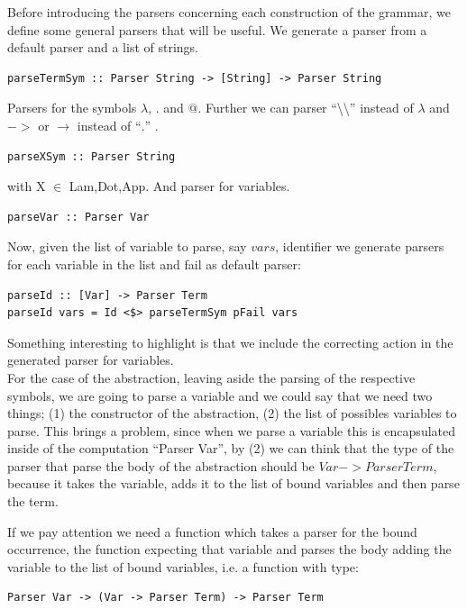 \documentclass[a4paper,10pt]{article}
\begin{document}
Before introducing the parsers concerning each construction of the grammar, 
we define some general parsers that will be useful.
We generate a parser from a default parser and a list of strings.

\begin{lstlisting}
parseTermSym :: Parser String -> [String] -> Parser String
\end{lstlisting}

Parsers for the symbols $\lambda$, $.$ and $@$. Further we can
parser ``\textbackslash \textbackslash'' instead of $\lambda$ and $->$ or $\rightarrow$
instead of ``$.$'' .

\begin{lstlisting}
parseXSym :: Parser String
\end{lstlisting} with X $\in$ {Lam,Dot,App}. And parser for variables.

\begin{lstlisting}
parseVar :: Parser Var
\end{lstlisting}

Now, given the list of variable to parse, say $vars$, identifier
we generate parsers for each variable in the list and fail as default parser:

\begin{lstlisting}
parseId :: [Var] -> Parser Term
parseId vars = Id <$> parseTermSym pFail vars
\end{lstlisting}

Something interesting to highlight is that we include the correcting action in
the generated parser for variables.\\

For the case of the abstraction, leaving aside the parsing of the respective symbols,
we are going to parse a variable and we could say that we need two things;
(1) the constructor of the abstraction, (2) the list of possibles variables to parse.
This brings a problem, since when we parse a variable this is encapsulated inside
of the computation ``Parser Var'', by (2) we can think that the type of the parser
that parse the body of the abstraction should be $Var -> Parser Term$, because it takes the
variable, adds it to the list of bound variables and then parse the term.

If we pay attention we need a function which takes a parser for the bound occurrence,
the function expecting that variable and parses the body adding the variable to the
list of bound variables, i.e. a function with type:

\begin{lstlisting}
Parser Var -> (Var -> Parser Term) -> Parser Term
\end{lstlisting}
\end{document}
